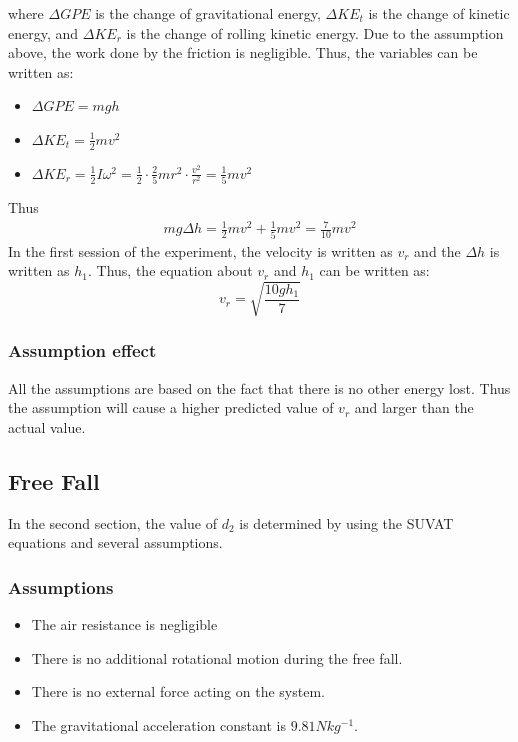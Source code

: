 \documentclass[conference]{IEEEtran}
\begin{document}
        where $\Delta GPE$ is the change of gravitational energy, $\Delta KE_t$ is the change of kinetic energy, and $\Delta KE_r$ is the change of rolling kinetic energy. Due to the assumption above, the work done by the friction is negligible. Thus, the variables can be written as:
        \begin{itemize}
            \item $\Delta GPE = mgh$ 
            \item $\Delta KE_t = \frac{1}{2}mv^2$ 
            \item $\Delta KE_r = \frac{1}{2}I\omega^2 = \frac{1}{2}\cdot \frac{2}{5}mr^2\cdot\frac{v^2}{r^2} = \frac{1}{5}mv^2$ 
        \end{itemize}
        Thus 
        \begin{equation}
            \begin{aligned}
                mg\Delta h = \frac{1}{2}mv^2 + \frac{1}{5}mv^2 = \frac{7}{10}mv^2 \nonumber
            \end{aligned}
        \end{equation}
        In the first session of the experiment, the velocity is written as $v_r$ and the $\Delta h$ is written as $h_1$. Thus, the equation about $v_r$ and $h_1$ can be written as:
        \begin{equation}\label{vr}
            v_r = \sqrt{\frac{10gh_1}{7}}
        \end{equation}
        \subsubsection{Assumption effect}
            All the assumptions are based on the fact that there is no other energy lost. Thus the assumption will cause a higher predicted value of $v_r$ and larger than the actual value.
    \subsection{Free Fall}
    In the second section, the value of $d_2$ is determined by using the SUVAT equations and several assumptions.
        \subsubsection{Assumptions}
            \begin{itemize}
                \item The air resistance is negligible
                \item There is no additional rotational motion during the free fall.
                \item There is no external force acting on the system.
                \item The gravitational acceleration constant is $9.81 Nkg^{-1}$.
            \end{itemize}
\end{document}
